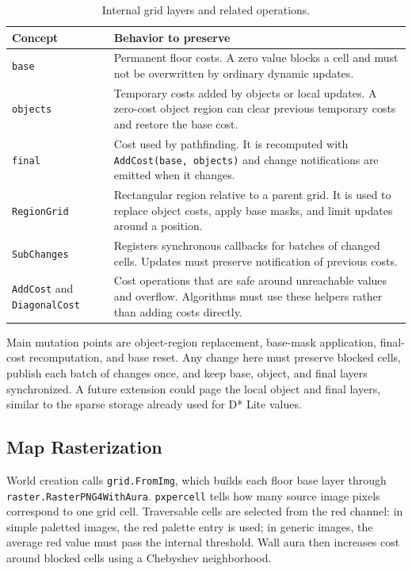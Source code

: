 \documentclass[12pt,a4paper]{report}
\begin{document}
\begin{table}[H]
\centering
\begin{tabular}{|p{}|p{}|}
\hline
\textbf{Concept} & \textbf{Behavior to preserve} \\
\hline
\texttt{base} &
Permanent floor costs. A zero value blocks a cell and must not be overwritten by
ordinary dynamic updates. \\
\hline
\texttt{objects} &
Temporary costs added by objects or local updates. A zero-cost object region can
clear previous temporary costs and restore the base cost. \\
\hline
\texttt{final} &
Cost used by pathfinding. It is recomputed with \texttt{AddCost(base, objects)}
and change notifications are emitted when it changes. \\
\hline
\texttt{RegionGrid} &
Rectangular region relative to a parent grid. It is used to replace object
costs, apply base masks, and limit updates around a position. \\
\hline
\texttt{SubChanges} &
Registers synchronous callbacks for batches of changed cells. Updates must
preserve notification of previous costs. \\
\hline
\texttt{AddCost} and \texttt{DiagonalCost} &
Cost operations that are safe around unreachable values and overflow. Algorithms
must use these helpers rather than adding costs directly. \\
\hline
\end{tabular}
\caption{Internal grid layers and related operations.}
\end{table}

Main mutation points are object-region replacement, base-mask application,
final-cost recomputation, and base reset. Any change here must preserve blocked
cells, publish each batch of changes once, and keep base, object, and final
layers synchronized. A future extension could page the local object and final
layers, similar to the sparse storage already used for D* Lite values.

\subsection{Map Rasterization}

World creation calls \texttt{grid.FromImg}, which builds each floor base layer
through \newline \texttt{raster.RasterPNG4WithAura}. \texttt{pxpercell} tells how many
source image pixels correspond to one grid cell. Traversable cells are selected
from the red channel: in simple paletted images, the red palette entry is used;
in generic images, the average red value must pass the internal threshold. Wall
aura then increases cost around blocked cells using a Chebyshev neighborhood.
\end{document}
